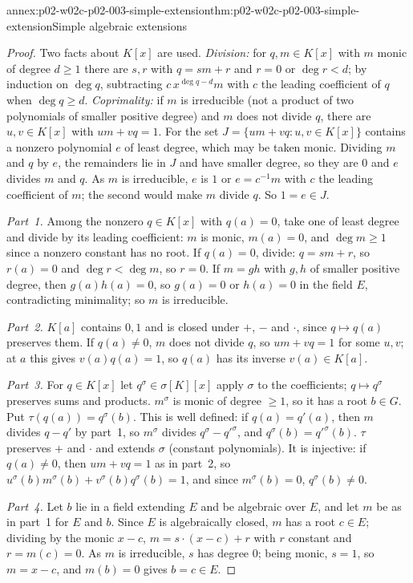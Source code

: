 \begin{annexitem}{annex:p02-w02c-p02-003-simple-extension}{thm:p02-w02c-p02-003-simple-extension}{Simple algebraic extensions}
\begin{proof}
Two facts about \(K[x]\) are used.  \emph{Division:} for \(q,m\in K[x]\)
with \(m\) monic of degree \(d\geq1\) there are \(s,r\) with \(q=sm+r\)
and \(r=0\) or \(\deg r<d\); by induction on \(\deg q\), subtracting
\(c\,x^{\deg q-d}m\) with \(c\) the leading coefficient of \(q\) when
\(\deg q\geq d\).  \emph{Coprimality:} if \(m\) is irreducible (not a
product of two polynomials of smaller positive degree) and \(m\) does not
divide \(q\), there are \(u,v\in K[x]\) with \(um+vq=1\).  For the set
\(J=\{um+vq:u,v\in K[x]\}\) contains a nonzero polynomial \(e\) of least
degree, which may be taken monic.  Dividing \(m\) and \(q\) by \(e\), the
remainders lie in \(J\) and have smaller degree, so they are \(0\) and
\(e\) divides \(m\) and \(q\).  As \(m\) is irreducible, \(e\) is \(1\) or
\(e=c^{-1}m\) with \(c\) the leading coefficient of \(m\); the second
would make \(m\) divide \(q\).  So \(1=e\in J\).

\emph{Part~1.}  Among the nonzero \(q\in K[x]\) with \(q(a)=0\), take one
of least degree and divide by its leading coefficient: \(m\) is monic,
\(m(a)=0\), and \(\deg m\geq1\) since a nonzero constant has no root.  If
\(q(a)=0\), divide: \(q=sm+r\), so \(r(a)=0\) and \(\deg r<\deg m\), so
\(r=0\).  If \(m=gh\) with \(g,h\) of smaller positive degree, then
\(g(a)h(a)=0\), so \(g(a)=0\) or \(h(a)=0\) in the field \(E\),
contradicting minimality; so \(m\) is irreducible.

\emph{Part~2.}  \(K[a]\) contains \(0,1\) and is closed under \(+\),
\(-\) and \(\cdot\), since \(q\mapsto q(a)\) preserves them.  If
\(q(a)\neq0\), \(m\) does not divide \(q\), so \(um+vq=1\) for some
\(u,v\); at \(a\) this gives \(v(a)q(a)=1\), so \(q(a)\) has its inverse
\(v(a)\in K[a]\).

\emph{Part~3.}  For \(q\in K[x]\) let \(q^\sigma\in\sigma[K][x]\) apply
\(\sigma\) to the coefficients; \(q\mapsto q^\sigma\) preserves sums and
products.  \(m^\sigma\) is monic of degree \(\geq1\), so it has a root
\(b\in G\).  Put \(\tau(q(a))=q^\sigma(b)\).  This is well defined: if
\(q(a)=q'(a)\), then \(m\) divides \(q-q'\) by part~1, so \(m^\sigma\)
divides \(q^\sigma-q'^\sigma\), and \(q^\sigma(b)=q'^\sigma(b)\).
\(\tau\) preserves \(+\) and \(\cdot\) and extends \(\sigma\) (constant
polynomials).  It is injective: if \(q(a)\neq0\), then \(um+vq=1\) as in
part~2, so \(u^\sigma(b)m^\sigma(b)+v^\sigma(b)q^\sigma(b)=1\), and since
\(m^\sigma(b)=0\), \(q^\sigma(b)\neq0\).

\emph{Part~4.}  Let \(b\) lie in a field extending \(E\) and be algebraic
over \(E\), and let \(m\) be as in part~1 for \(E\) and \(b\).  Since \(E\)
is algebraically closed, \(m\) has a root \(c\in E\); dividing by the
monic \(x-c\), \(m=s\cdot(x-c)+r\) with \(r\) constant and \(r=m(c)=0\).
As \(m\) is irreducible, \(s\) has degree \(0\); being monic, \(s=1\), so
\(m=x-c\), and \(m(b)=0\) gives \(b=c\in E\).
\end{proof}
\end{annexitem}

